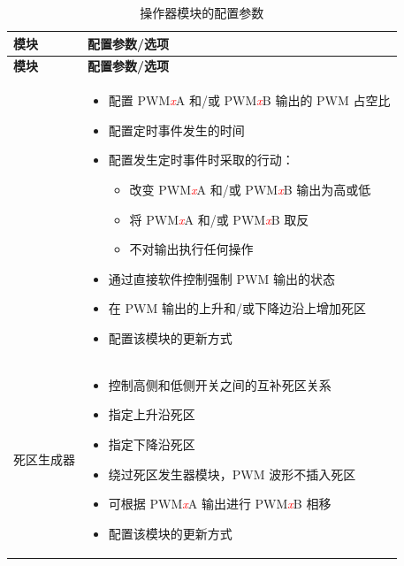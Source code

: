 \begin{longtable}[c]{|p{4cm}|p{11cm}|}
\caption{操作器模块的配置参数}
\label{tab:mcpwm-param-operator}
    \\\hline
    \rowcolor{lightgray}
 \textbf{模块} & \textbf{配置参数/选项} \\ \hline 

\endfirsthead\hline
 \rowcolor{lightgray}
 \textbf{模块} & \textbf{配置参数/选项}\\
 \hline 
\endhead
\endfoot

\multirow{10}{*}{PWM 生成器} &
    \vspace{-1em}
    \begin{itemize}
        \item 配置 PWM\textcolor{red}{\it{x}}A 和/或 PWM\textcolor{red}{\it{x}}B 输出的 PWM 占空比
        \item 配置定时事件发生的时间
        \item 配置发生定时事件时采取的行动：
        \begin{itemize}
           \item 改变 PWM\textcolor{red}{\it{x}}A 和/或 PWM\textcolor{red}{\it{x}}B 输出为高或低
           \item 将 PWM\textcolor{red}{\it{x}}A 和/或 PWM\textcolor{red}{\it{x}}B 取反
           \item 不对输出执行任何操作
        \end{itemize}
        \item 通过直接软件控制强制 PWM 输出的状态
        \item 在 PWM 输出的上升和/或下降边沿上增加死区
        \item 配置该模块的更新方式
     \vspace{-1em}\end{itemize} \\\hline
     
\multirow{7}{*}{死区生成器}  &
    \vspace{-1em}\begin{itemize}
        \item 控制高侧和低侧开关之间的互补死区关系
        \item 指定上升沿死区
        \item 指定下降沿死区
        \item 绕过死区发生器模块，PWM 波形不插入死区
        \item 可根据 PWM\textcolor{red}{\it{x}}A 输出进行 PWM\textcolor{red}{\it{x}}B 相移
        \item 配置该模块的更新方式
    \vspace{-1em}\end{itemize}\\\hline
    

\end{longtable}
